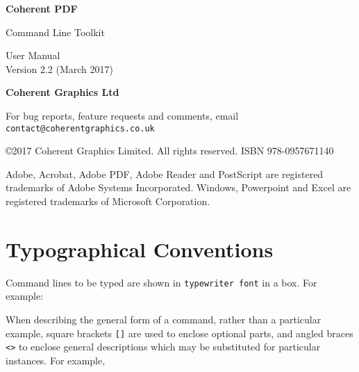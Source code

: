 \documentclass{book}
\newcommand{\smallgap}{\bigskip}
\begin{document}
\frontmatter
\pagestyle{empty}

\begin{flushright}

{\sffamily \bfseries \Huge Coherent PDF

\vspace{2mm}
Command Line Toolkit}

\vspace{12mm}

{\Huge User Manual}\\
Version 2.2 (March 2017)

\vspace{25mm}

\vfill


\vspace{2mm}
{\sffamily \bfseries \LARGE Coherent Graphics Ltd}

\end{flushright}

\clearpage

\pagestyle{empty}
\noindent For bug reports, feature requests and comments, email\\ \texttt{contact@coherentgraphics.co.uk}

\vspace*{\fill}
\noindent\copyright 2017 Coherent Graphics Limited. All rights reserved. ISBN 978-0957671140

\smallgap 
\noindent Adobe, Acrobat, Adobe PDF, Adobe Reader and PostScript are
registered trademarks of Adobe Systems Incorporated. Windows, Powerpoint and
Excel are registered trademarks of Microsoft Corporation.

\cleardoublepage
\tableofcontents

\cleardoublepage
\chapter*{Typographical Conventions}
Command lines to be typed are shown in \texttt{typewriter\hspace{-1mm} font} in a box.
For example:

\noindent{}



\noindent When describing the general form of a command, rather than a particular
example, square brackets \verb|[]| are used to enclose optional parts, and
angled braces \verb!<>! to enclose general descriptions which may be
substituted for particular instances. For example,
\end{document}
